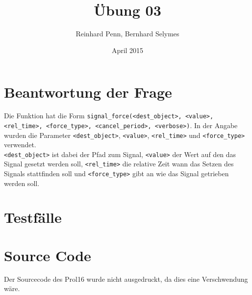 \documentclass[12pt,a4paper]{article}
\begin{document}
\title{Übung 03}
\author{Reinhard Penn, Bernhard Selymes}
\date{April 2015}

\normalsize


\newcommand{\Uebung}{BFMSV}
\newcommand{\srcpath}{../../src}
\newcommand{\simpath}{../../sim}



\section{Beantwortung der Frage}
Die Funktion hat die Form \texttt{\textdollar signal\_force(<dest\_object>, <value>, <rel\_time>, <force\_type>, <cancel\_period>, <verbose>)}. In der Angabe wurden die Parameter \texttt{<dest\_object>}, \texttt{<value>}, \texttt{<rel\_time>} und \texttt{<force\_type>} verwendet. \\
\texttt{<dest\_object>} ist dabei der Pfad zum Signal, \texttt{<value>} der Wert auf den das Signal gesetzt werden soll, \texttt{<rel\_time>} die relative Zeit wann das Setzen des Signals stattfinden soll und \texttt{<force\_type>} gibt an wie das Signal getrieben werden soll.

\section{Testfälle}



\section{Source Code}

Der Sourcecode des Prol16 wurde nicht ausgedruckt, da dies eine Verschwendung wäre.












\end{document}
